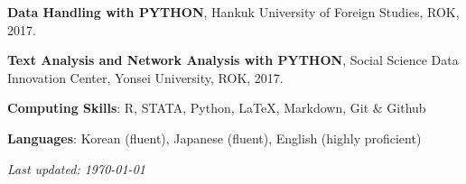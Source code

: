 \documentclass[margin,line]{res}
\begin{document}
\begin{resume}
{\bf Data Handling with PYTHON}, Hankuk University of Foreign Studies, ROK, 2017.

\vspace{-.1cm}

{\bf Text Analysis and Network Analysis with PYTHON}, Social Science Data Innovation Center, Yonsei University, ROK, 2017.


{\bf Computing Skills}: R, STATA, Python, \LaTeX, Markdown, Git \& Github

\vspace*{-3mm}
{\bf Languages}:  Korean (fluent), Japanese (fluent), English (highly proficient)


\mbox{}
\vfill
\centering \textit{Last updated: \today}


\end{resume}
\end{document}
